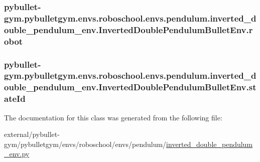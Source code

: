 \subsubsection[{\texorpdfstring{robot}{robot}}]{\setlength{\rightskip}{0pt plus 5cm}pybullet-\/gym.\+pybulletgym.\+envs.\+roboschool.\+envs.\+pendulum.\+inverted\+\_\+double\+\_\+pendulum\+\_\+env.\+Inverted\+Double\+Pendulum\+Bullet\+Env.\+robot}\hypertarget{classpybullet-gym_1_1pybulletgym_1_1envs_1_1roboschool_1_1envs_1_1pendulum_1_1inverted__double__02ae3ce2c545b467956bc876f69901b4_aedbbf34ed636afc45683063f5ff256c6}{}\label{classpybullet-gym_1_1pybulletgym_1_1envs_1_1roboschool_1_1envs_1_1pendulum_1_1inverted__double__02ae3ce2c545b467956bc876f69901b4_aedbbf34ed636afc45683063f5ff256c6}
\subsubsection[{\texorpdfstring{state\+Id}{stateId}}]{\setlength{\rightskip}{0pt plus 5cm}pybullet-\/gym.\+pybulletgym.\+envs.\+roboschool.\+envs.\+pendulum.\+inverted\+\_\+double\+\_\+pendulum\+\_\+env.\+Inverted\+Double\+Pendulum\+Bullet\+Env.\+state\+Id}\hypertarget{classpybullet-gym_1_1pybulletgym_1_1envs_1_1roboschool_1_1envs_1_1pendulum_1_1inverted__double__02ae3ce2c545b467956bc876f69901b4_aa65e4414ef7cb569cd3cf10a377b745b}{}\label{classpybullet-gym_1_1pybulletgym_1_1envs_1_1roboschool_1_1envs_1_1pendulum_1_1inverted__double__02ae3ce2c545b467956bc876f69901b4_aa65e4414ef7cb569cd3cf10a377b745b}


The documentation for this class was generated from the following file\+:\begin{DoxyCompactItemize}
\item 
external/pybullet-\/gym/pybulletgym/envs/roboschool/envs/pendulum/\hyperlink{roboschool_2envs_2pendulum_2inverted__double__pendulum__env_8py}{inverted\+\_\+double\+\_\+pendulum\+\_\+env.\+py}\end{DoxyCompactItemize}
